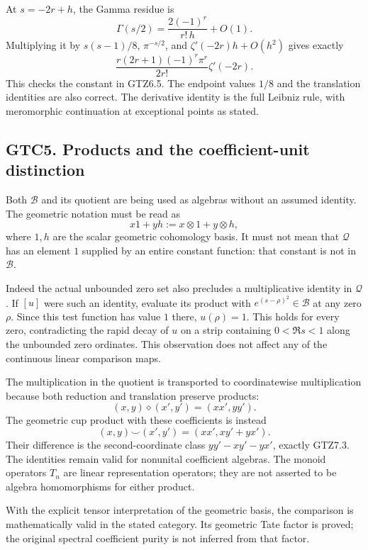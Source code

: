 At \(s=-2r+h\), the Gamma residue is \[
\Gamma(s/2)=\frac{2(-1)^r}{r!\,h}+O(1).
\] Multiplying it by \(s(s-1)/8\), \(\pi^{-s/2}\), and
\(\zeta'(-2r)h+O(h^2)\) gives exactly \[
\frac{r(2r+1)(-1)^r\pi^r}{2r!}\zeta'(-2r).
\] This checks the constant in GTZ6.5. The endpoint values \(1/8\) and
the translation identities are also correct. The derivative identity is
the full Leibniz rule, with meromorphic continuation at exceptional
points as stated.

\subsection{GTC5. Products and the coefficient-unit
distinction}\label{gtc5.-products-and-the-coefficient-unit-distinction}

Both \(\mathcal B\) and its quotient are being used as algebras without
an assumed identity. The geometric notation must be read as \[
x1+yh:=x\otimes1+y\otimes h,
\] where \(1,h\) are the scalar geometric cohomology basis. It must not
mean that \(\mathcal Q\) has an element \(1\) supplied by an entire
constant function: that constant is not in \(\mathcal B\).

Indeed the actual unbounded zero set also precludes a multiplicative
identity in \(\mathcal Q\). If \([u]\) were such an identity, evaluate
its product with \(e^{(s-\rho)^2}\in\mathcal B\) at any zero \(\rho\).
Since this test function has value \(1\) there, \(u(\rho)=1\). This
holds for every zero, contradicting the rapid decay of \(u\) on a strip
containing \(0<\Re s<1\) along the unbounded zero ordinates. This
observation does not affect any of the continuous linear comparison
maps.

The multiplication in the quotient is transported to coordinatewise
multiplication because both reduction and translation preserve products:
\[
(x,y)\diamond(x',y')=(xx',yy').
\] The geometric cup product with these coefficients is instead \[
(x,y)\smile(x',y')=(xx',xy'+yx').
\] Their difference is the second-coordinate class \(yy'-xy'-yx'\),
exactly GTZ7.3. The identities remain valid for nonunital coefficient
algebras. The monoid operators \(T_n\) are linear representation
operators; they are not asserted to be algebra homomorphisms for either
product.

With the explicit tensor interpretation of the geometric basis, the
comparison is mathematically valid in the stated category. Its geometric
Tate factor is proved; the original spectral coefficient purity is not
inferred from that factor.
